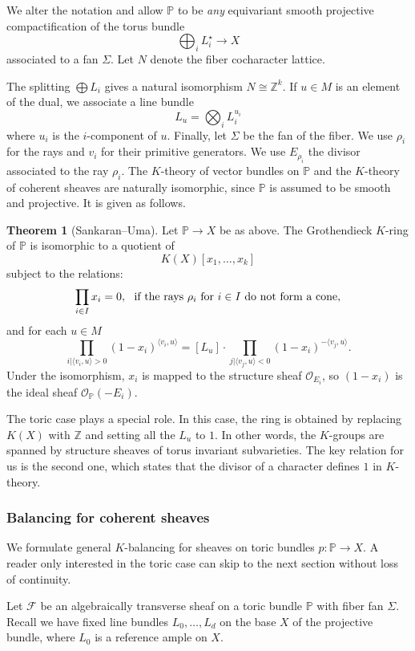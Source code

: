 \documentclass[11pt]{amsart}
\theoremstyle{definition}
\theoremstyle{definition}
\newtheorem{theorem}{Theorem}[subsection]
\begin{document}
We alter the notation and allow $\mathbb P$ to be {\it any} equivariant smooth projective compactification of the torus bundle 
\[
\bigoplus_i L_i^\star \to X
\]
associated to a fan $\Sigma$. Let $N$ denote the fiber cocharacter lattice. 

The splitting $\bigoplus L_i$ gives a natural isomorphism $N\cong\mathbb Z^k$. If $u\in M$ is an element of the dual, we associate a line bundle
\[
L_u = \bigotimes_i L_i^{u_i}
\]
where $u_i$ is the $i$-component of $u$. Finally, let $\Sigma$ be the fan of the fiber. We use $\rho_i$ for the rays and $v_i$ for their primitive generators. We use $E_{\rho_i}$ the divisor associated to the ray $\rho_i$. The $K$-theory of vector bundles on $\mathbb P$ and the $K$-theory of coherent sheaves are naturally isomorphic, since $\mathbb P$ is assumed to be smooth and projective. It is given as follows. 

\begin{theorem}[Sankaran--Uma]
Let $\mathbb P\to X$ be as above. The Grothendieck $K$-ring of $\mathbb P$ is isomorphic to a quotient of 
\[
K(X)[x_1,\ldots,x_k]
\]
subject to the relations:
\[
\prod_{i\in I} x_i = 0, \ \ \textnormal{if the rays $\rho_i$ for $i\in I$ do not form a cone},
\]
and for each $u\in M$
\[
\prod_{i|\langle v_i,u\rangle>0} (1-x_i)^{\langle v_i,u\rangle} = [L_u]\cdot \prod_{j|\langle v_j,u\rangle<0} (1-x_i)^{-\langle v_j,u\rangle}.
\]
Under the isomorphism, $x_i$ is mapped to the structure sheaf $\mathcal O_{E_i}$, so $(1-x_i)$ is the ideal sheaf $\mathcal O_{\mathbb P}(-E_i)$. 
\end{theorem}

The toric case plays a special role. In this case, the ring is obtained by replacing $K(X)$ with $\mathbb Z$ and setting all the $L_u$ to $1$. In other words, the $K$-groups are spanned by structure sheaves of torus invariant subvarieties. The key relation for us is the second one, which states that the divisor of a character defines $1$ in $K$-theory. 

\subsubsection{Balancing for coherent sheaves} We formulate general $K$-balancing for sheaves on toric bundles $p\colon \mathbb P\to X$. A reader only interested in the toric case can skip to the next section without loss of continuity. 

Let $\mathcal F$ be an algebraically transverse sheaf on a toric bundle $\mathbb P$ with fiber fan $\Sigma$. Recall we have fixed line bundles $L_0,\ldots, L_d$ on the base $X$ of the projective bundle, where $L_0$ is a reference ample on $X$. 
\end{document}
